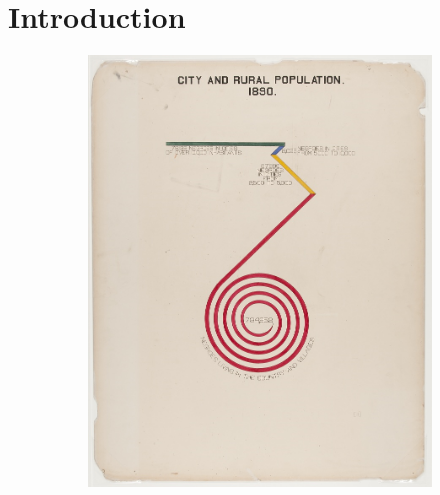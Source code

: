 \documentclass[../main.tex]{subfiles}
\begin{document}
\section{Introduction}
\label{sec:introduction}
\begin{figure}
   
\end{figure}



\begin{figure}
    \begin{subfigure}{.24\textwidth}
        \includegraphics[width=1\textwidth]{figures/intro/du_bois_spinny.png}
        \caption{}
        \label{fig:intro_dpa}
    \end{subfigure}
    \begin{subfigure}{.24\textwidth}

\end{subfigure}
\end{figure}
\end{document}
